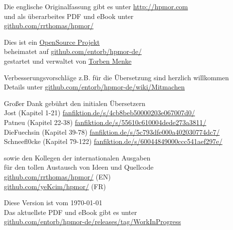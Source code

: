 \begin{center}
{\vspace*{1\baselineskip}
Die englische Originalfassung gibt es unter {\small\href{http://hpmor.com}{http://hpmor.com}}\\
und als überarbeites PDF und eBook unter\\
{\small\href{https://github.com/rrthomas/hpmor/}{github.com/rrthomas/hpmor/}}\\
}
\end{center}


\newpage
\begin{center}
\noindent
\vfill
Dies ist ein \href{https://github.com/entorb/hpmor-de/}{OpenSource Projekt}\\
beheimatet auf {\small\href{https://github.com/entorb/hpmor-de/}{github.com/entorb/hpmor-de/}}\\
gestartet und verwaltet von \href{https://entorb.net}{Torben Menke}

\vspace*{1\baselineskip}
Verbesserungsvorschläge z.B. für die Übersetzung sind herzlich willkommen\\
Details unter {\small\href{https://github.com/entorb/hpmor-de/wiki/Mitmachen}{github.com/entorb/hpmor-de/wiki/Mitmachen}}

\vspace*{1\baselineskip}
Großer Dank gebührt den initialen Übersetzern\\
Jost (Kapitel 1-21) {\small\href{https://www.fanfiktion.de/s/4cb8beb50000203e067007d0/}{fanfiktion.de/s/4cb8beb50000203e067007d0/}}\\
Patneu (Kapitel 22-38) {\small\href{https://www.fanfiktion.de/s/55610c610004dede273a3811/}{fanfiktion.de/s/55610c610004dede273a3811/}}\\
DieFuechsin (Kapitel 39-78) {\small\href{https://www.fanfiktion.de/s/5c793dfe000a402030774dc7/}{fanfiktion.de/s/5c793dfe000a402030774dc7/}}\\
Schneefl0cke (Kapitel 79-122) {\small\href{https://www.fanfiktion.de/s/60044849000ccc541aef297e/}{fanfiktion.de/s/60044849000ccc541aef297e/}}

\vspace*{1\baselineskip}
sowie den Kollegen der internationalen Ausgaben\\
für den tollen Austausch von Ideen und Quellcode\\
{\small\href{https://github.com/rrthomas/hpmor/}{github.com/rrthomas/hpmor/}} (EN)\\
{\small\href{https://github.com/yeKcim/hpmor/}{github.com/yeKcim/hpmor/}} (FR)

\vspace*{1\baselineskip}
Diese Version ist vom \today{}\\
Das aktuellste PDF und eBook gibt es unter\\
{\small\href{https://github.com/entorb/hpmor-de/releases/tag/WorkInProgress}{github.com/entorb/hpmor-de/releases/tag/WorkInProgress}}\\
\end{center}
